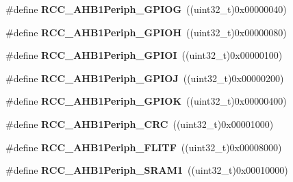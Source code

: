 \begin{DoxyCompactItemize}
\mbox{\label{group___r_c_c___a_h_b1___peripherals_ga3e0023a2f4f4cc853c97868e317e9d29}} 
\#define {\bfseries R\+C\+C\+\_\+\+A\+H\+B1\+Periph\+\_\+\+G\+P\+I\+OG}~((uint32\+\_\+t)0x00000040)
\item 
\mbox{\label{group___r_c_c___a_h_b1___peripherals_ga073b5753f347cab954917b6952fcc2bf}} 
\#define {\bfseries R\+C\+C\+\_\+\+A\+H\+B1\+Periph\+\_\+\+G\+P\+I\+OH}~((uint32\+\_\+t)0x00000080)
\item 
\mbox{\label{group___r_c_c___a_h_b1___peripherals_ga0c524d44daec48e06fbbb9e2105b3ca4}} 
\#define {\bfseries R\+C\+C\+\_\+\+A\+H\+B1\+Periph\+\_\+\+G\+P\+I\+OI}~((uint32\+\_\+t)0x00000100)
\item 
\mbox{\label{group___r_c_c___a_h_b1___peripherals_ga57a6fcab1f9c689751f101c870a28cdb}} 
\#define {\bfseries R\+C\+C\+\_\+\+A\+H\+B1\+Periph\+\_\+\+G\+P\+I\+OJ}~((uint32\+\_\+t)0x00000200)
\item 
\mbox{\label{group___r_c_c___a_h_b1___peripherals_ga95a04fc1004a6baf955b450687ba1c4f}} 
\#define {\bfseries R\+C\+C\+\_\+\+A\+H\+B1\+Periph\+\_\+\+G\+P\+I\+OK}~((uint32\+\_\+t)0x00000400)
\item 
\mbox{\label{group___r_c_c___a_h_b1___peripherals_ga7314a410cea5a4e45cd6c98f91014379}} 
\#define {\bfseries R\+C\+C\+\_\+\+A\+H\+B1\+Periph\+\_\+\+C\+RC}~((uint32\+\_\+t)0x00001000)
\item 
\mbox{\label{group___r_c_c___a_h_b1___peripherals_gab5efbe63b3089fe814aa078646d76525}} 
\#define {\bfseries R\+C\+C\+\_\+\+A\+H\+B1\+Periph\+\_\+\+F\+L\+I\+TF}~((uint32\+\_\+t)0x00008000)
\item 
\mbox{\label{group___r_c_c___a_h_b1___peripherals_ga34053b56adc7175ac4bcf9b5e02bbc40}} 
\#define {\bfseries R\+C\+C\+\_\+\+A\+H\+B1\+Periph\+\_\+\+S\+R\+A\+M1}~((uint32\+\_\+t)0x00010000)
\item 
\mbox{\label{group___r_c_c___a_h_b1___peripherals_gaa28c3681e26ac56481a715c40c98b5d6}} 

\end{DoxyCompactItemize}
